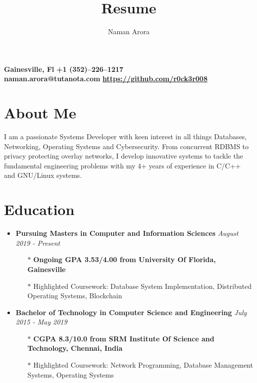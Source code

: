 \documentclass[10pt,a4paper]{article}
\makeatletter
\renewcommand{\maketitle}
{
	\begin{flushleft}
		\textbf{\Huge\theauthor}
	\end{flushleft}
	\begin{flushleft}
		\small{\textbf{{\faMapMarker} \hspace{0.2cm} Gainesville, Fl} \hspace{2.5cm} \textbf{{\faMobile} \hspace{0.2cm} +1 (352)--226--1217} \\
				\textbf{{\faEnvelope} \hspace{0.1cm} naman.arora@tutanota.com} \hspace{0.5cm}
				\textbf{{\faGithub} \hspace{0.1cm} \href{https://github.com/r0ck3r008}{https://github.com/r0ck3r008}}}
	\end{flushleft}
}
\makeatother
\begin{document}
\title{Resume}
\author{Naman Arora}
\maketitle


\section{{\faUser} About Me}
\begin{flushleft}
	I am a passionate Systems Developer with keen interest in all things Databases, Networking, Operating Systems and Cybersecurity. From concurrent RDBMS to privacy protecting overlay networks, I develop innovative systems to tackle the fundamental engineering problems with my 4+ years of experience in C/C++ and GNU/Linux systems.
\end{flushleft}

\section{{\faUniversity} Education}

\begin{itemize}[noitemsep,nolistsep]
	\item{\textbf{Pursuing Masters in Computer and Information Sciences} \hfill \textit{August 2019 - Present}}
		\begin{itemize}[leftmargin=*]
			\setlength\itemsep{-0.25em}
			\item[$\ast$]{\textbf{Ongoing GPA 3.53/4.00 from University Of Florida, Gainesville}}
			\item[$\ast$]{Highlighted Coursework: Database System Implementation, Distributed Operating Systems, Blockchain}
		\end{itemize}
	\item{\textbf{Bachelor of Technology in Computer Science and Engineering} \hfill \textit{July 2015 - May 2019}}
		\begin{itemize}[leftmargin=*]
			\setlength\itemsep{-0.25em}
			\item[$\ast$]{\textbf{CGPA 8.3/10.0 from SRM Institute Of Science and Technology, Chennai, India}}
			\item[$\ast$]{Highlighted Coursework: Network Programming, Database Management Systems, Operating Systems}
		\end{itemize}
\end{itemize}
\end{document}
